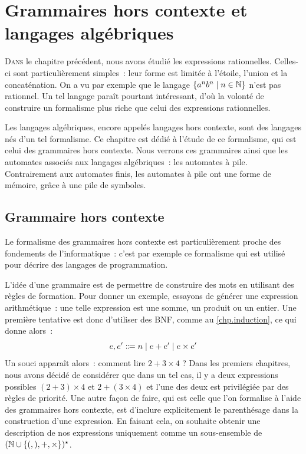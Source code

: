 \chapter[Langages algébriques]{Grammaires hors contexte et langages algébriques}
\label{chp.alg}

\minitoc

\lettrine{D}{ans} le chapitre précédent, nous avons étudié les expressions
rationnelles. Celles-ci sont particulièrement simples~: leur forme est limitée
à l'étoile, l'union et la concaténation. On a vu par exemple que le langage
$\left\{ a^nb^n \;\middle\vert\; n\in\mathbb N \right\}$ n'est pas rationnel. Un tel langage paraît pourtant
intéressant, d'où la volonté de construire un formalisme plus riche que celui
des expressions rationnelles.

Les langages algébriques, encore appelés langages hors contexte, sont des
langages nés d'un tel formalisme. Ce chapitre est dédié à l'étude de ce
formalisme, qui est celui des grammaires hors contexte. Nous verrons ces
grammaires ainsi que les automates associés aux langages algébriques~: les
automates à pile. Contrairement aux automates finis, les automates à pile ont
une forme de mémoire, grâce à une pile de symboles.

\section{Grammaire hors contexte}\label{sec.alg1}

Le formalisme des grammaires hors contexte est particulièrement proche des
fondements de l'informatique~: c'est par exemple ce formalisme qui est utilisé
pour décrire des langages de programmation.

L'idée d'une grammaire est de permettre de construire des mots en utilisant des
règles de formation. Pour donner un exemple, essayons de générer une expression
arithmétique~: une telle expression est une somme, un produit ou un entier. Une
première tentative est donc d'utiliser des BNF, comme au \cref{chp.induction},
ce qui donne alors~:
\[e,e' \inddefeq n \mid e + e' \mid e \times e'\]
Un souci apparaît alors~: comment lire $2 + 3 \times 4$ ? Dans les premiers
chapitres, nous avons décidé de considérer que dans un tel cas, il y a deux
expressions possibles $(2 + 3) \times 4$ et $2 + (3 \times 4)$ et l'une des deux
est privilégiée par des règles de priorité. Une autre façon de faire, qui est
celle que l'on formalise à l'aide des grammaires hors contexte, est d'inclure
explicitement le parenthésage dans la construction d'une expression. En faisant
cela, on souhaite obtenir une description de nos expressions uniquement comme
un sous-ensemble de $(\mathbb N \cup \{(,),+,\times\})^\star$.

